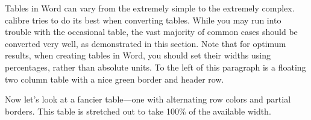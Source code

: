 \documentclass[\officeparserdriver 12pt]{article}
\begin{document}
{\hspace*{21.6bp}Tables in Word can vary from the extremely simple to the extremely complex. calibre tries to do its best when converting tables. While you may run into trouble with the occasional table, the vast majority of common cases should be converted very well, as demonstrated in this section. Note that for optimum results, when creating tables in Word, you should set their widths using percentages, rather than absolute units.  To the left of this paragraph is a floating two column table with a nice green border and header row.\par}

{\hspace*{21.6bp}Now let’s look at a fancier table—one with alternating row colors and partial borders. This table is stretched out to take 100\% of the available width.\par}
\end{document}
